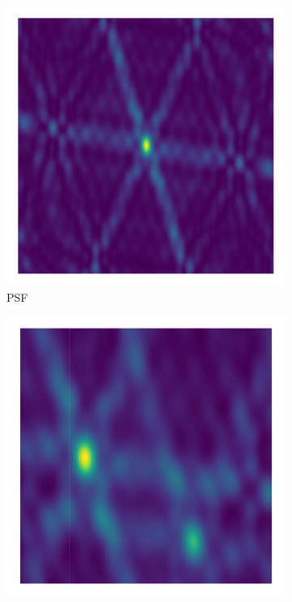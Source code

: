 \begin{figure}[h!]
	\begin{subfigure}[b]{0.28\linewidth}
		\includegraphics[width=\linewidth, trim={18px 19px 18px 18px}, clip]{./chapters/01.intro/img/psf.png}
		\caption{PSF}
	\end{subfigure}
	\begin{subfigure}[b]{0.28\linewidth}
		\includegraphics[width=\linewidth, trim={18px 19px 18px 18px}, clip]{./chapters/01.intro/img/dirty_image.png}

\end{subfigure}
\end{figure}
